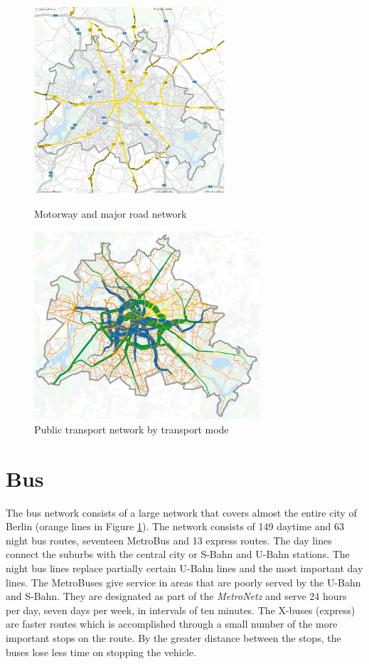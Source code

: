 \begin{figure}[h]
	\begin{minipage}[c]{0.4\linewidth}
		\centering
		\includegraphics[height=7cm]{MobilityInTheCityJPG/Graphs/Motorways.pdf}
		\caption{Motorway and major road network}
		\label{motorways}
	\end{minipage}\hfill
	\begin{minipage}[c]{0.5\linewidth}
		\centering
		\includegraphics[height=7cm]{MobilityInTheCityJPG/Graphs/PTnetwork.pdf}
		\caption{Public transport network by transport mode}
		\label{ptnetwork}
	\end{minipage}
\end{figure}


\section{Bus}

The bus network consists of a large network that covers almost the entire city of Berlin (orange lines in Figure \ref{ptnetwork}). The network consists of 149 daytime and 63 night bus routes, seventeen MetroBus and 13 express routes.  The day lines connect the suburbs with the central city or S-Bahn and U-Bahn stations. The night bus lines replace partially certain U-Bahn lines and the most important day lines. The MetroBuses give service in areas that are poorly served by the U-Bahn and S-Bahn. They are designated as part of the \textit{MetroNetz} and serve 24 hours per day, seven days per week, in intervals of ten minutes. The X-buses (express) are faster routes which is accomplished through a small number of the more important stops on the route. By the greater distance between the stops, the buses lose less time on stopping the vehicle\cite{xpress}. \\

